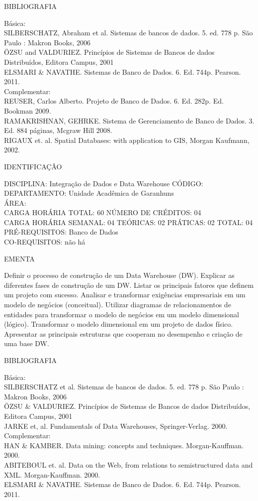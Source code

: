 \documentclass[
	12pt,				%
	openright,			%
  oneside,     %
	a4paper,			%
	chapter=TITLE,		%
	english,			%
	french,				%
	spanish,			%
	brazil				%
	]{abntex2}
\begin{document}
\begin{apendicesenv}
BIBLIOGRAFIA 

Básica:\\
SILBERSCHATZ, Abraham et al. Sistemas de bancos de dados. 5. ed. 778 p.
São Paulo : Makron Books, 2006\\
ÖZSU and VALDURIEZ. Princípios de Sistemas de Bancos de dados
Distribuídos, Editora Campus, 2001\\
ELSMARI \& NAVATHE. Sistemas de Banco de Dados. 6. Ed. 744p. Pearson.
2011.\\
Complementar:\\
REUSER, Carlos Alberto. Projeto de Banco de Dados. 6. Ed. 282p. Ed.
Bookman 2009.\\
RAMAKRISHNAN, GEHRKE. Sistema de Gerenciamento de Banco de Dados. 3. Ed.
884 páginas, Mcgraw Hill 2008.\\
RIGAUX et. al. Spatial Databases: with application to GIS, Morgan
Kaufmann, 2002.\

\newpage IDENTIFICAÇÃO

DISCIPLINA: Integração de Dados e Data Warehouse CÓDIGO:\\
DEPARTAMENTO: Unidade Acadêmica de Garanhuns\\
ÁREA: \\
CARGA HORÁRIA TOTAL: 60 NÚMERO DE CRÉDITOS: 04\\
CARGA HORÁRIA SEMANAL: 04 TEÓRICAS: 02 PRÁTICAS: 02 TOTAL: 04\\
PRÉ-REQUISITOS: Banco de Dados\\
CO-REQUISITOS: não há

EMENTA 

Definir o processo de construção de um Data Warehouse (DW). Explicar as
diferentes fases de construção de um DW. Listar os principais fatores
que definem um projeto com sucesso. Analisar e transformar exigências
empresariais em um modelo de negócios (conceitual). Utilizar diagramas
de relacionamentos de entidades para transformar o modelo de negócios
em um modelo dimensional (lógico). Transformar o modelo dimensional em
um projeto de dados físico. Apresentar as principais estruturas que
cooperam no desempenho e criação de uma base DW.

BIBLIOGRAFIA 

Básica:\\
SILBERSCHATZ et al. Sistemas de bancos de dados. 5. ed. 778 p. São Paulo
: Makron Books, 2006\\
ÖZSU \& VALDURIEZ. Princípios de Sistemas de Bancos de dados
Distribuídos, Editora Campus, 2001\\
JARKE et, al. Fundamentals of Data Warehouses, Springer-Verlag. 2000.\\
Complementar:\\
HAN \& KAMBER. Data mining: concepts and techniques. Morgan-Kauffman.
2000.\\
ABITEBOUL et. al. Data on the Web, from relations to semistructured data
and XML. Morgan-Kauffman. 2000.\\
ELSMARI \& NAVATHE. Sistemas de Banco de Dados. 6. Ed. 744p. Pearson.
2011.


\end{apendicesenv}
\end{document}
